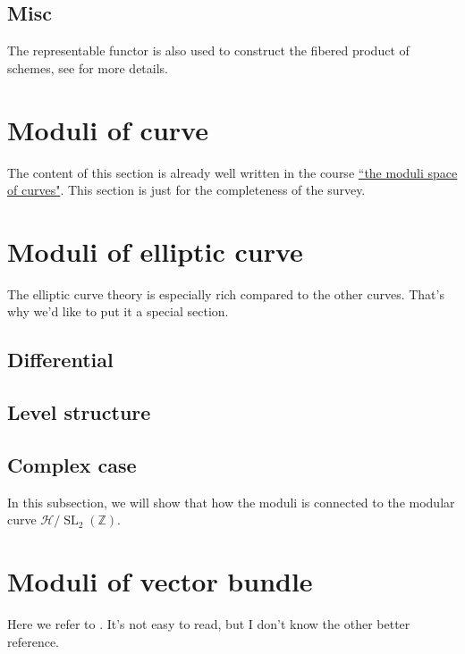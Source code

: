 \documentclass[reqno,11pt]{amsart}
\numberwithin{equation}{section}
\theoremstyle{plain}
\theoremstyle{plain}
\numberwithin{equation}{section}
\theoremstyle{remark}
\DeclareMathOperator{\SL}{\operatorname{SL}}
\begin{document}
\subsection{Misc}The representable functor is also used to construct the fibered product of schemes, see \cite[9.1.6-7]{FOAG} for more details.
\section{Moduli of curve}
The content of this section is already well written in the course \href{https://johannesschmitt.gitlab.io/moduli_of_curves}{``the moduli space of curves"}. This section is just for the completeness of the survey.

\section{Moduli of elliptic curve}
The elliptic curve theory is especially rich compared to the other curves. That's why we'd like to put it a special section.
\subsection{Differential}
\subsection{Level structure}
\subsection{Complex case}
In this subsection, we will show that how the moduli is connected to the modular curve $\mathcal{H}/\SL_2(\mathbb{Z})$.

\section{Moduli of vector bundle}
Here we refer to \cite{huybrechts2010geometry}. It's not easy to read, but I don't know the other better reference.


\end{document}
